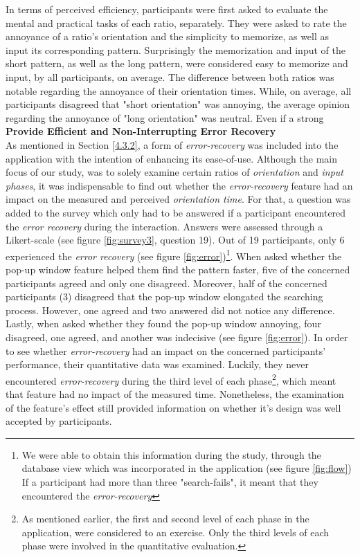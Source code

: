 In terms of perceived efficiency, participants were first asked to evaluate the mental and practical tasks of each ratio, separately. They were asked to rate the annoyance of a ratio's orientation and the simplicity to memorize, as well as input its corresponding pattern. Surprisingly the memorization and input of the short pattern, as well as the long pattern, were considered easy to memorize and input, by all participants, on average. The difference between both ratios was notable regarding the annoyance of their orientation times. While, on average, all participants disagreed that "short orientation" was annoying, the average opinion regarding the annoyance of "long orientation" was neutral. Even if a strong \\




\textbf{Provide Efficient and Non-Interrupting Error Recovery}\\
As mentioned in Section \ref{4.3.2}, a form of \textit{error-recovery} was included into the application with the intention of enhancing its ease-of-use. Although the main focus of our study, was to solely examine certain ratios of \textit{orientation} and \textit{input phases}, it was indispensable to find out whether the \textit{error-recovery} feature had an impact on the measured and perceived \textit{orientation time}. For that, a question was added to the survey which only had to be answered if a participant encountered the \textit{error recovery} during the interaction. Answers were assessed through a Likert-scale (see figure \ref{fig:survey3}, question 19). Out of 19 participants, only 6 experienced the \textit{error recovery} (see figure \ref{fig:error})\footnote{We were able to obtain this information during the study, through the database view which was incorporated in the application (see figure \ref{fig:flow}) If a participant had more than three "search-fails", it meant that they encountered the \textit{error-recovery}}. When asked whether the pop-up window feature helped them find the pattern faster, five of the concerned participants agreed and only one disagreed. Moreover, half of the concerned participants (3) disagreed that the pop-up window elongated the searching process. However, one agreed and two answered did not notice any difference. Lastly, when asked whether they found the pop-up window annoying, four disagreed, one agreed, and another was indecisive (see figure \ref{fig:error}). In order to see whether \textit{error-recovery} had an impact on the concerned participants' performance, their quantitative data was examined. Luckily, they never encountered \textit{error-recovery} during the third level of each phase\footnote{As mentioned earlier, the first and second level of each phase in the application, were considered to an exercise. Only the third levels of each phase were involved in the quantitative evaluation.}, which meant that feature had no impact of the measured time. Nonetheless, the examination of the feature's effect still provided information on whether it's design was well accepted by participants. 

